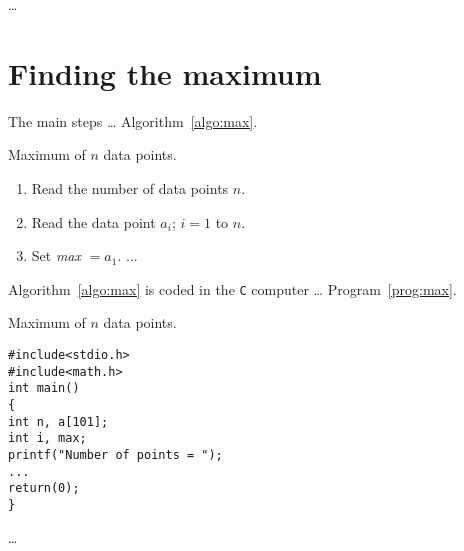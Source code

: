 \documentclass[a4paper]{article}
\begin{document}
…
\section{Finding the maximum}
The main steps … Algorithm~\ref{algo:max}.
\begin{algorithm}
    \caption{Maximum of $n$ data points.}
    \label{algo:max}
    \begin{enumerate}
        \item Read the number of data points $n$.
        \item Read the data point $a_i$; $i=1$ to $n$.
        \item Set {\it max} $=a_1$. ...
    \end{enumerate}
\end{algorithm}
%
Algorithm~\ref{algo:max} is coded in the {\tt C} computer …
Program~\ref{prog:max}.
\begin{program}
    \caption{Maximum of $n$ data points.}
    \label{prog:max}
    \begin{verbatim}
#include<stdio.h>
#include<math.h>
int main()
{
int n, a[101];
int i, max;
printf("Number of points = ");
...
return(0);
}
\end{verbatim}
\end{program}
…
\end{document}
